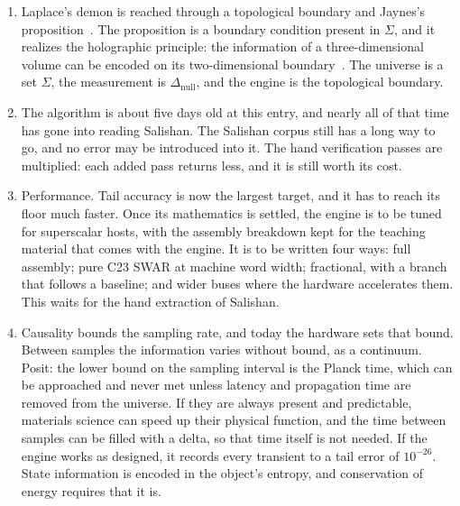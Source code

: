 \begin{enumerate}
\begin{enumerate}
\item Self-detection reduces to $\mathrm{appxrep}(\Delta) \circ \pi_0$. The machine therefore uses the same
code paths, registers and set operations for observing itself as for its primary computation.
\end{enumerate}

\item Laplace's demon is reached through a topological boundary and Jaynes's
proposition~\cite{src:Jaynes}. The proposition is a boundary condition present in $\Sigma$, and it
realizes the holographic principle: the information of a three-dimensional volume can be encoded on
its two-dimensional boundary~\cite{src:Susskind-1995}. The universe is a set $\Sigma$, the
measurement is $\Delta_{\mathrm{null}}$, and the engine is the topological boundary.

\item The algorithm is about five days old at this entry, and nearly all of that time has gone into
reading Salishan. The Salishan corpus still has a long way to go, and no error may be introduced into
it. The hand verification passes are multiplied: each added pass returns less, and it is still worth
its cost.

\item Performance. Tail accuracy is now the largest target, and it has to reach its floor much faster.
Once its mathematics is settled, the engine is to be tuned for superscalar hosts, with the assembly
breakdown kept for the teaching material that comes with the engine. It is to be written four ways:
full assembly; pure C23 SWAR at machine word width; fractional, with a branch that follows a baseline;
and wider buses where the hardware accelerates them. This waits for the hand extraction of Salishan.

\item Causality bounds the sampling rate, and today the hardware sets that bound. Between samples the
information varies without bound, as a continuum. Posit: the lower bound on the sampling interval is
the Planck time, which can be approached and never met unless latency and propagation time are
removed from the universe. If they are always present and predictable, materials science can speed up
their physical function, and the time between samples can be filled with a delta, so that time itself
is not needed. If the engine works as designed, it records every transient to a tail error of
$10^{-26}$. State information is encoded in the object's entropy, and conservation of energy requires
that it is.


\end{enumerate}

